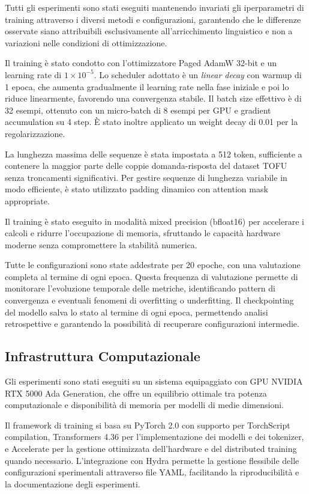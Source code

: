 Tutti gli esperimenti sono stati eseguiti mantenendo invariati gli iperparametri di training attraverso i diversi metodi e configurazioni, garantendo che le differenze osservate siano attribuibili esclusivamente all'arricchimento linguistico e non a variazioni nelle condizioni di ottimizzazione.

Il training è stato condotto con l'ottimizzatore Paged AdamW 32-bit e un learning rate di $1 \times 10^{-5}$. Lo scheduler adottato è un \textit{linear decay} con warmup di 1 epoca, che aumenta gradualmente il learning rate nella fase iniziale e poi lo riduce linearmente, favorendo una convergenza stabile. Il batch size effettivo è di 32 esempi, ottenuto con un micro-batch di 8 esempi per GPU e gradient accumulation su 4 step. È stato inoltre applicato un weight decay di 0.01 per la regolarizzazione.

La lunghezza massima delle sequenze è stata impostata a 512 token, sufficiente a contenere la maggior parte delle coppie domanda-risposta del dataset TOFU senza troncamenti significativi. Per gestire sequenze di lunghezza variabile in modo efficiente, è stato utilizzato padding dinamico con attention mask appropriate.

Il training è stato eseguito in modalità mixed precision (bfloat16) per accelerare i calcoli e ridurre l'occupazione di memoria, sfruttando le capacità hardware moderne senza compromettere la stabilità numerica.

Tutte le configurazioni sono state addestrate per 20 epoche, con una valutazione completa al termine di ogni epoca. Questa frequenza di valutazione permette di monitorare l'evoluzione temporale delle metriche, identificando pattern di convergenza e eventuali fenomeni di overfitting o underfitting. Il checkpointing del modello salva lo stato al termine di ogni epoca, permettendo analisi retrospettive e garantendo la possibilità di recuperare configurazioni intermedie.

\subsection{Infrastruttura Computazionale}

Gli esperimenti sono stati eseguiti su un sistema equipaggiato con GPU NVIDIA RTX 5000 Ada Generation, che offre un equilibrio ottimale tra potenza computazionale e disponibilità di memoria per modelli di medie dimensioni.

Il framework di training si basa su PyTorch 2.0 con supporto per TorchScript compilation, Transformers 4.36 per l'implementazione dei modelli e dei tokenizer, e Accelerate per la gestione ottimizzata dell'hardware e del distributed training quando necessario. L'integrazione con Hydra permette la gestione flessibile delle configurazioni sperimentali attraverso file YAML, facilitando la riproducibilità e la documentazione degli esperimenti.

